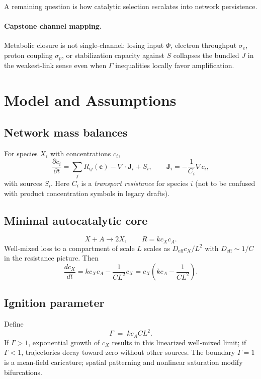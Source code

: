 \documentclass[11pt,a4paper]{article}
\begin{document}
A remaining question is how catalytic selection escalates into network persistence.

\paragraph{Capstone channel mapping.}
Metabolic closure is not single-channel: losing input $\Phi$, electron throughput $\sigma_e$, proton coupling $\sigma_p$, or stabilization capacity against $S$ collapses the bundled $J$ in the weakest-link sense even when $\Gamma$ inequalities locally favor amplification.

\section{Model and Assumptions}

\subsection{Network mass balances}
For species $X_i$ with concentrations $c_i$,
\begin{equation}
\frac{\partial c_i}{\partial t}
= \sum_j R_{ij}(\bm{c}) - \nabla\cdot\bm{J}_i + S_i,\qquad
\bm{J}_i = -\frac{1}{C_i}\nabla c_i,
\end{equation}
with sources $S_i$. Here $C_i$ is a \emph{transport resistance} for species $i$ (not to be confused with product concentration symbols in legacy drafts).

\subsection{Minimal autocatalytic core}
\begin{equation}
X + A \rightarrow 2X,\qquad R = k c_X c_A.
\end{equation}
Well-mixed loss to a compartment of scale $L$ scales as $D_{\mathrm{eff}}c_X/L^2$ with $D_{\mathrm{eff}}\sim 1/C$ in the resistance picture. Then
\begin{equation}
\frac{dc_X}{dt}
= k c_X c_A - \frac{1}{C L^2}c_X
= c_X\left(k c_A - \frac{1}{C L^2}\right).
\end{equation}

\subsection{Ignition parameter}
Define
\begin{equation}
\Gamma \;=\; k c_A C L^2.
\end{equation}
If $\Gamma>1$, exponential growth of $c_X$ results in this linearized well-mixed limit; if $\Gamma<1$, trajectories decay toward zero without other sources. The boundary $\Gamma=1$ is a mean-field caricature; spatial patterning and nonlinear saturation modify bifurcations.
\end{document}
